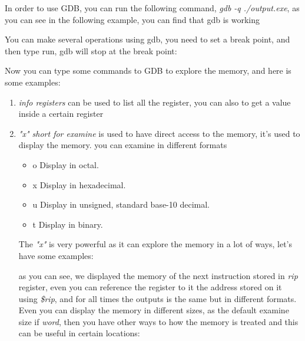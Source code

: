 \documentclass{article}
\begin{document}
In order to use GDB, you can run the following command, \textit{gdb -q ./output.exe}, as you can see in the following example, you can find that gdb is working


You can make several operations using gdb, you need to set a break point, and then type run, gdb will stop at the break point:


Now you can type some commands to GDB to explore the memory, and here is some examples:
\begin{enumerate}
    \item \textit{info registers} can be used to list all the register, you can also to get a value inside a certain register
    
    
    \item \textit{"x" short for examine} is used to have direct access to the memory, it's used to display the memory. you can examine in different formats
        \begin{itemize}
            \item o Display in octal.
            \item x Display in hexadecimal.
            \item u Display in unsigned, standard base-10 decimal.
            \item t Display in binary.
        \end{itemize}

    The \textit{"x"} is very powerful as it can explore the memory in a lot of ways, let's have some examples:

    

    as you can see, we displayed the memory of the next instruction stored in \textit{rip} register, even you can reference the register to it the address stored on it using \textit{\$rip}, and for all times the outputs is the same but in different formats.\\
    
    Even you can display the memory in different sizes, as the default examine size if \textit{word}, then you have other ways to how the memory is treated and this can be useful in certain locations:

    


\end{enumerate}
\end{document}
